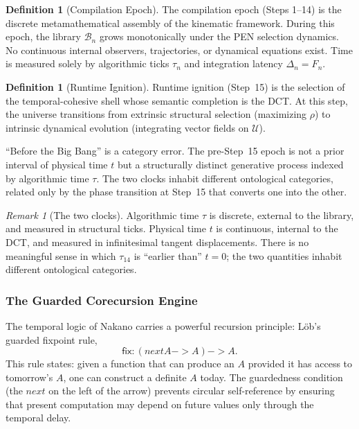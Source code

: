 \documentclass[11pt,a4paper]{article}
\def\to{->}%
\def\bigcirc{next}%
\theoremstyle{plain}
\theoremstyle{definition}
\newtheorem{definition}[theorem]{Definition}
\theoremstyle{remark}
\newtheorem{remark}[theorem]{Remark}
\newcommand{\U}{\mathcal{U}}
\newcommand{\B}{\mathcal{B}}
\begin{document}
\begin{definition}[Compilation Epoch]
The compilation epoch (Steps 1--14) is the discrete metamathematical assembly of the kinematic framework.  During this epoch, the library $\B_n$ grows monotonically under the PEN selection dynamics.  No continuous internal observers, trajectories, or dynamical equations exist.  Time is measured solely by algorithmic ticks $\tau_n$ and integration latency $\Delta_n = F_n$.
\end{definition}

\begin{definition}[Runtime Ignition]
Runtime ignition (Step~15) is the selection of the temporal-cohesive shell whose semantic completion is the DCT.  At this step, the universe transitions from extrinsic structural selection (maximizing $\rho$) to intrinsic dynamical evolution (integrating vector fields on $\U$).
\end{definition}

``Before the Big Bang'' is a category error.  The pre-Step~15 epoch is not a prior interval of physical time $t$ but a structurally distinct generative process indexed by algorithmic time $\tau$.  The two clocks inhabit different ontological categories, related only by the phase transition at Step~15 that converts one into the other.

\begin{remark}[The two clocks]
\label{rem:two-clocks}
Algorithmic time $\tau$ is discrete, external to the library, and measured in structural ticks.  Physical time $t$ is continuous, internal to the DCT, and measured in infinitesimal tangent displacements.  There is no meaningful sense in which $\tau_{14}$ is ``earlier than'' $t = 0$; the two quantities inhabit different ontological categories.
\end{remark}


\subsubsection{The Guarded Corecursion Engine}

The temporal logic of Nakano carries a powerful recursion principle: L\"{o}b's guarded fixpoint rule,
\begin{equation}
\label{eq:lob}
\mathsf{fix} : (\bigcirc A \to A) \to A.
\end{equation}
This rule states: given a function that can produce an $A$ provided it has access to tomorrow's $A$, one can construct a definite $A$ today.  The guardedness condition (the $\bigcirc$ on the left of the arrow) prevents circular self-reference by ensuring that present computation may depend on future values only through the temporal delay.
\end{document}
